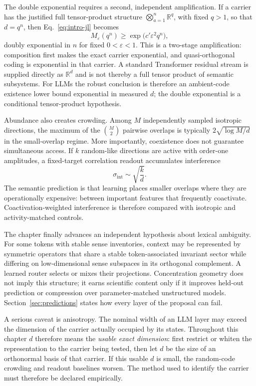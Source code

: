 \documentclass[
  aps,
  reprint,
  superscriptaddress,
  floatfix,
  nofootinbib,
  longbibliography
]{revtex4-2}
\newcommand{\R}{\mathbb{R}}
\newcommand{\Msem}{M}
\newcommand{\sint}{\sigma_{\mathrm{int}}}
\begin{document}
The double exponential requires a second, independent amplification.  If a
carrier has the justified full tensor-product structure
$\bigotimes_{a=1}^{n}\R^q$, with fixed $q>1$, so that $d=q^n$, then
Eq.~\eqref{eq:intro-jl} becomes
%
\begin{equation}
\label{eq:intro-double}
M_\varepsilon(q^n)\geq
\exp\!\bigl(c'\varepsilon^2q^n\bigr),
\end{equation}
%
doubly exponential in $n$ for fixed $0<\varepsilon<1$.  This is a two-stage amplification: composition
first makes the exact carrier exponential, and quasi-orthogonal coding is
exponential in that carrier.  A
standard Transformer residual stream is supplied directly as $\R^d$ and is
not thereby a full tensor product of semantic subsystems.  For LLMs the robust
conclusion is therefore an ambient-code existence lower bound exponential in
measured $d$; the double exponential is a conditional tensor-product
hypothesis.

Abundance also creates crowding.  Among $\Msem$ independently sampled
isotropic directions, the maximum of the $\binom{\Msem}{2}$ pairwise overlaps
is typically
$2\sqrt{\log\Msem/d}$ in the small-overlap regime.  More importantly,
coexistence does not guarantee simultaneous access.  If $k$ random-like
directions are active with order-one amplitudes, a fixed-target correlation
readout accumulates interference
%
\begin{equation}
\label{eq:intro-readout}
\sint\sim\sqrt{\frac{k}{d}}.
\end{equation}
%
The semantic prediction is that learning places smaller overlaps where they
are operationally expensive: between important
features that frequently coactivate.  Coactivation-weighted interference is
therefore compared with isotropic and activity-matched controls.

The chapter finally advances an independent hypothesis about lexical ambiguity.
For some tokens with stable sense inventories, context may be represented by symmetric
operators that share a stable token-associated invariant sector while
differing on low-dimensional sense subspaces in its orthogonal complement.  A
learned router selects or mixes their projections.  Concentration geometry
does not imply this structure; it earns scientific content only if it improves
held-out prediction or compression over parameter-matched unstructured models.
Section~\ref{sec:predictions} states how every layer of the proposal can fail.

A serious caveat is anisotropy.  The nominal width of an LLM layer may exceed
the dimension of the carrier actually occupied by its states.  Throughout this
chapter $d$ therefore means the \emph{usable exact dimension}: first restrict
or whiten the representation to the carrier being tested, then let $d$ be the
size of an orthonormal basis of that carrier.
If this usable $d$ is small, the random-code crowding and readout baselines
worsen.  The
method used to identify the carrier must therefore be declared empirically.
\end{document}
